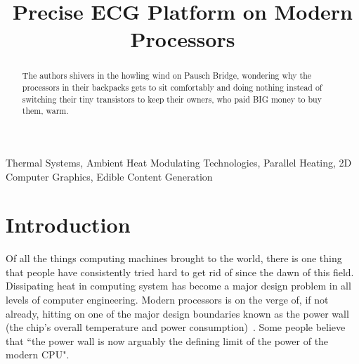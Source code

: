 \documentclass[conference]{IEEEtran}
\begin{document}
\title{Precise ECG Platform on Modern Processors}

\author{
\and
{}
}

\maketitle

\begin{abstract}
The authors shivers in the howling wind on Pausch Bridge, wondering why the processors in their backpacks gets to sit comfortably and doing nothing instead of switching their tiny transistors to keep their owners, who paid BIG money to buy them, warm. 
\end{abstract}

\begin{IEEEkeywords}
Thermal Systems, Ambient Heat Modulating Technologies, Parallel Heating, 2D Computer Graphics, Edible Content Generation
\end{IEEEkeywords}

\section{Introduction}

Of all the things computing machines brought to the world, there is one thing that people 
have consistently tried hard to get rid of since the dawn of this field. Dissipating heat
in computing system has become a major design problem in all levels of computer engineering. 
Modern processors is on the verge of, if not already, hitting on one of the major design 
boundaries known as the power wall (the chip’s overall temperature and power consumption)~\cite{patterson2006future}. 
Some people believe that ``the power wall is now arguably the defining limit of the power 
of the modern CPU"\cite{mims2010}.
\end{document}

